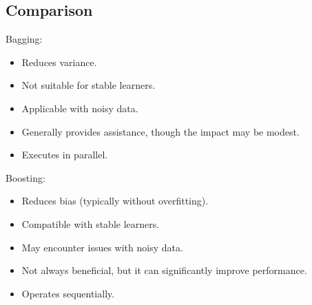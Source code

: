 \subsection{Comparison}
Bagging:
\begin{itemize}
    \item Reduces variance.
    \item Not suitable for stable learners.
    \item Applicable with noisy data.
    \item Generally provides assistance, though the impact may be modest.
    \item Executes in parallel.
\end{itemize}
Boosting:
\begin{itemize}
    \item Reduces bias (typically without overfitting).
    \item Compatible with stable learners.
    \item May encounter issues with noisy data.
    \item Not always beneficial, but it can significantly improve performance.
    \item Operates sequentially.
\end{itemize}